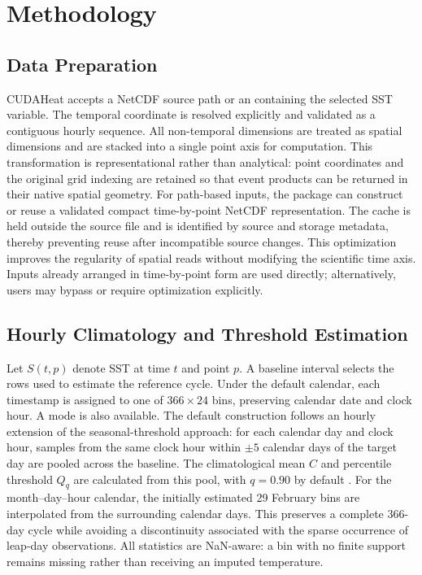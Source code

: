\section{Methodology}

\subsection{Data Preparation}



CUDAHeat accepts a NetCDF source path or an  containing the selected SST variable. The temporal coordinate is resolved explicitly and validated as a contiguous hourly sequence. All non-temporal dimensions are treated as spatial dimensions and are stacked into a single point axis for computation. This transformation is representational rather than analytical: point coordinates and the original grid indexing are retained so that event products can be returned in their native spatial geometry.
For path-based inputs, the package can construct or reuse a validated compact time-by-point NetCDF representation. The cache is held outside the source file and is identified by source and storage metadata, thereby preventing reuse after incompatible source changes. This optimization improves the regularity of spatial reads without modifying the scientific time axis. Inputs already arranged in time-by-point form are used directly; alternatively, users may bypass or require optimization explicitly.

\subsection{Hourly Climatology and Threshold Estimation}



Let $S(t,p)$ denote SST at time $t$ and point $p$. A baseline interval selects the rows used to estimate the reference cycle. Under the default  calendar, each timestamp is assigned to one of $366\times24$ bins, preserving calendar date and clock hour. A  mode is also available. The default construction follows an hourly extension of the seasonal-threshold approach: for each calendar day and clock hour, samples from the same clock hour within $\pm5$ calendar days of the target day are pooled across the baseline. The climatological mean $C$ and percentile threshold $Q_q$ are calculated from this pool, with $q=0.90$ by default \citep{Hobday2016}.
For the month--day--hour calendar, the initially estimated 29 February bins are interpolated from the surrounding calendar days. This preserves a complete 366-day cycle while avoiding a discontinuity associated with the sparse occurrence of leap-day observations. All statistics are NaN-aware: a bin with no finite support remains missing rather than receiving an imputed temperature.



